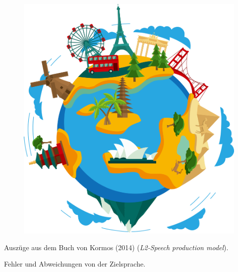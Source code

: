 \documentclass[
  letterpaper,
]{scrbook}
\begin{document}
\begin{figure}

{\centering 

\href{https://www.clipartmax.com/middle/m2i8K9H7K9H7G6b1_earth-clip-art-world-travel-clipart-png/}{\includegraphics[width=1\textwidth,height=\textheight]{./pictures/clipart66213.png}}

}

\end{figure}

Auszüge aus dem Buch von Kormos (2014) (\emph{L2-Speech production
model}).

Fehler und Abweichungen von der Zielsprache.
\end{document}
